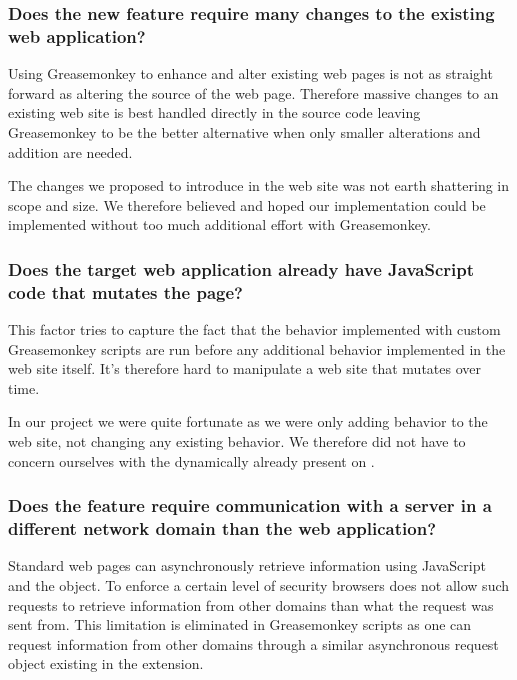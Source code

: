 \subsubsection{Does the new feature require many changes to the existing web
  application?}

Using Greasemonkey to enhance and alter existing web pages is not as straight
forward as altering the source of the web page. Therefore massive changes to
an existing web site is best handled directly in the source code leaving
Greasemonkey to be the better alternative when only smaller alterations and
addition are needed.

The changes we proposed to introduce in the \urort{} web site was not earth
shattering in scope and size. We therefore believed and hoped our
implementation could be implemented without too much additional effort with
Greasemonkey.

\subsubsection{Does the target web application already have JavaScript code
  that mutates the page?}

This factor tries to capture the fact that the behavior implemented with
custom Greasemonkey scripts are run before any additional behavior
implemented in the web site itself. It's therefore hard to manipulate
a web site that mutates over time.

In our project we were quite fortunate as we were only adding
behavior to the \urort{} web site, not changing any existing behavior.
We therefore did not have to concern ourselves with the dynamically
already present on \urort{}.

\subsubsection{Does the feature require communication with a server in a
  different network domain than the web application?}
\label{section:implementation.architecture,extending.different.domain}

Standard web pages can asynchronously retrieve information using
JavaScript and the  object. To enforce a certain
level of security browsers does not allow such requests to retrieve
information from other domains than what the request was sent from.
This limitation is eliminated in Greasemonkey scripts as one can request
information from other domains through a similar asynchronous request object
existing in the extension.

